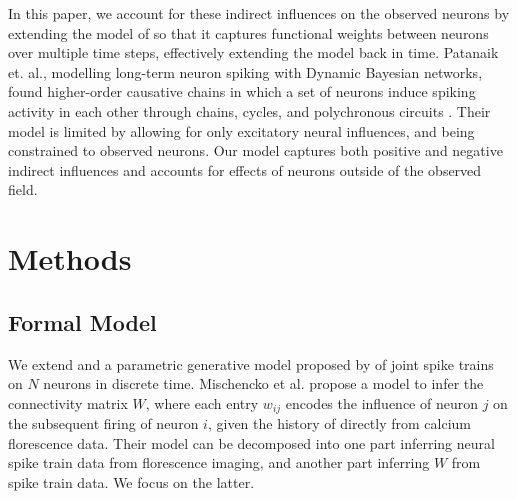 \documentclass{article}
\begin{document}
In this paper, we account for these indirect influences on the
observed neurons by extending the model of \citep{mishchencko2011}
so that it captures functional weights between neurons over multiple
time steps, effectively extending the model back in time. Patanaik
et.  al., modelling long-term neuron spiking with Dynamic Bayesian
networks, found higher-order causative chains in which a set of
neurons induce spiking activity in each other through chains, cycles,
and polychronous circuits \citep{patanaik2011}. Their model is
limited by allowing for only excitatory neural influences, and being
constrained to observed neurons.  Our model captures both positive
and negative indirect influences and accounts for effects of neurons
outside of the observed field.

\section{Methods}

\subsection{Formal Model}
We extend and a parametric generative model proposed by
\citep{mishchencko2011} of joint spike trains on $N$ neurons in
discrete time. Mischencko et al. propose a model to infer the
connectivity matrix $W$, where each entry $w_{ij}$ encodes the
influence of neuron $j$ on the subsequent firing of neuron $i$,
given the history of directly from calcium florescence data. Their
model can be decomposed into one part inferring neural spike train
data from florescence imaging, and another part inferring $W$ from
spike train data. We focus on the latter.
\end{document}
